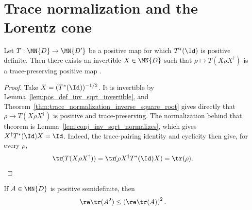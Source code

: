 \section{Trace normalization and the Lorentz cone}

\begin{lemma}
    \label{lem:making_positive_maps_trace_preserving}
    \leanok
    Let $T:\MN{D}\to\MN{D'}$ be a positive map for which $T^*(\Id)$ is
    positive definite. Then there exists an invertible $X\in\MN{D}$ such
    that $\rho\mapsto T(X\rho X^\dagger)$ is a trace-preserving positive map
    \cite[Chapter~3, Lemma ``Making positive maps trace preserving'']
    {Wolf2012Quantum}.
\end{lemma}

\begin{proof}\leanok
    Take $X=(T^*(\Id))^{-1/2}$. It is invertible by
    Lemma~\ref{lem:pos_def_inv_sqrt_invertible}, and
    Theorem~\ref{thm:trace_normalization_inverse_square_root} gives directly
    that $\rho\mapsto T(X\rho X^\dagger)$ is positive and trace-preserving.
    The normalization behind that theorem is
    Lemma~\ref{lem:conj_inv_sqrt_normalizes}, which gives
    $X^\dagger T^*(\Id)X=\Id$. Indeed, the trace-pairing identity and
    cyclicity then give, for every $\rho$,
    \begin{align}
        \tr\!(T(X\rho X^\dagger))
         & =\tr\!(\rho X^\dagger T^*(\Id)X)
        =\tr(\rho).
        \notag
    \end{align}
\end{proof}

\begin{theorem}
    \label{thm:psd_trace_square_le_square_trace}
    \leanok
    If $A \in \MN{D}$ is positive semidefinite, then
    \begin{align}
        \re\tr(A^2)
         & \le \left(\re\tr(A)\right)^2.
        \label{eq:channel_lorentz_forward}
    \end{align}
\end{theorem}

